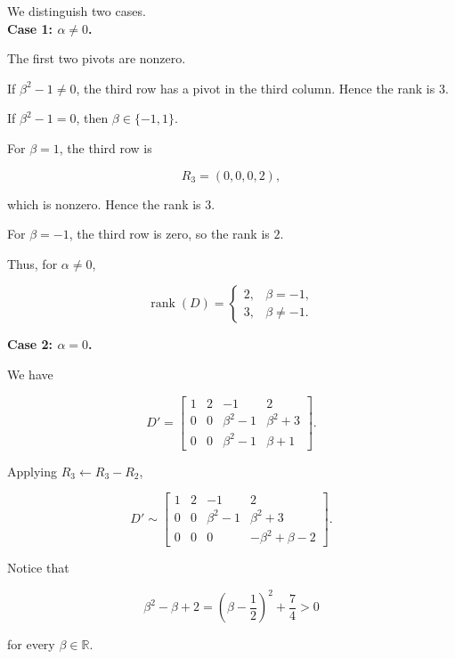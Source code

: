 \begin{enumerate}[label=\alph*)]
\begin{answer}
        We distinguish two cases. \\[0.5em]

        \textbf{Case 1: $\alpha\neq0$.}

        The first two pivots are nonzero.

        If $\beta^2-1\neq0$, the third row
        has a pivot in the third column.
        Hence the rank is $3$.

        If $\beta^2-1=0$, then
        $\beta\in\{-1,1\}$.

        For $\beta=1$, the third row is

        $$
        R_3=(0,0,0,2),
        $$

        which is nonzero. Hence the rank is $3$.

        For $\beta=-1$, the third row is zero,
        so the rank is $2$.

        Thus, for $\alpha\neq0$,

        $$
        \operatorname{rank}(D)=
        \begin{cases}
            2, & \beta=-1,\\
            3, & \beta\neq-1.
        \end{cases}
        $$

        \textbf{Case 2: $\alpha=0$.}

        We have

        $$
        D'=
        \begin{bmatrix}
            1 & 2 & -1 & 2 \\
            0 & 0 & \beta^2-1 & \beta^2+3 \\
            0 & 0 & \beta^2-1 & \beta+1
        \end{bmatrix}.
        $$

        Applying $R_3\leftarrow R_3-R_2$,

        $$
        D'\sim
        \begin{bmatrix}
            1 & 2 & -1 & 2 \\
            0 & 0 & \beta^2-1 & \beta^2+3 \\
            0 & 0 & 0 & -\beta^2+\beta-2
        \end{bmatrix}.
        $$

        Notice that

        $$
        \beta^2-\beta+2
        =\left(\beta-\frac12\right)^2+\frac74>0
        $$

        for every $\beta\in\mathbb{R}$.


\end{answer}
\end{enumerate}

